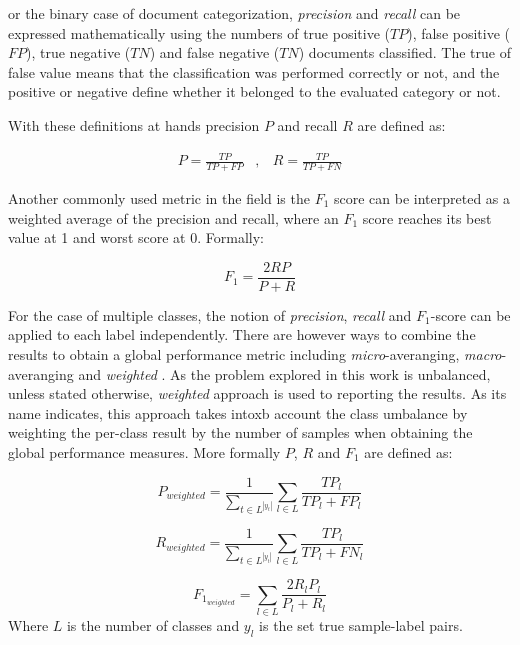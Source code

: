 or the binary case of document categorization, \textit{precision}  and \textit{recall}
can be expressed mathematically using the numbers of true positive ($TP$), false positive
($FP$), true negative ($TN$) and false negative ($TN$) documents
classified. The true of false value means that the classification
was performed correctly or not, and the positive or negative define
whether it belonged to the evaluated category or not. 

With these definitions  at hands precision $P$ and recall $R$ are defined as:


\begin{eqnarray}
P=\frac{TP}{TP+FP} & ,\, & R=\frac{TP}{TP+FN}\end{eqnarray}

Another commonly used metric in the field is the  $F_1$ score can be
interpreted as a weighted average of the precision and recall, where an $F_1$
score reaches its best value at 1 and worst score at 0. Formally:

\begin{equation}
  F_1=\frac{2RP}{P+R}
\end{equation}

For the case of multiple classes, the notion of \textit{precision}, \textit{recall} and $F_1$-score can be applied to each label independently. There are however ways to combine the results to obtain a global performance metric including \textit{micro}-averanging, \textit{macro}-averanging  and \textit{weighted} \cite{Sebastiani02}. As the problem explored in this work is unbalanced,  unless stated otherwise, \textit{weighted}  approach is used to reporting the results. As its name indicates, this approach takes intoxb account the class umbalance by weighting the per-class result by the number of samples  when obtaining the global performance measures. More formally $P$, $R$ and $F_1$ are defined as:


\begin{equation*}
P_{weighted}=\frac{1}{\sum_{t \in L^|y_t|} } \sum_{l \in L} \frac{TP_l}{TP_l+FP_l} 
\end{equation*}

\begin{equation*}
  R_{weighted} = \frac{1}{\sum_{t \in L^|y_t|} } \sum_{l \in L} \frac{TP_l}{TP_l+FN_l}
\end{equation*}


\begin{equation}
  F_{1_{weighted}}=\sum_{l \in L}\frac{2R_lP_l}{P_l+R_l}
\end{equation}
Where $L$ is the number of classes and $y_l$ is the set true sample-label pairs.




